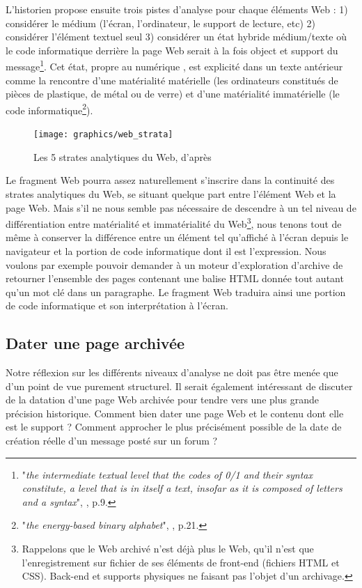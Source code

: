 \documentclass[symmetric,justified,marginals=raggedouter]{tufte-book}
\begin{document}
L'historien propose ensuite trois pistes d'analyse pour chaque éléments Web : 1) considérer le médium (l'écran, l'ordinateur, le support de lecture, etc) 2) considérer l'élément textuel seul 3) considérer un état hybride médium/texte où le code informatique derrière la page Web serait à la fois object et support du message\footnote{"\textit{the intermediate textual level that the codes of 0/1 and their syntax constitute, a level that is in itself a text, insofar as it is composed of letters and a syntax}", \citep{brugger_website_2009}, p.9.}. Cet état, propre au numérique \citep{finnemann_modernity_1997}, est explicité dans un texte antérieur \citep{brugger_does_2002} comme la rencontre d'une matérialité matérielle (les ordinateurs constitués de pièces de plastique, de métal ou de verre) et d'une matérialité immatérielle (le code informatique\footnote{"\textit{the energy-based binary alphabet}", \citep{brugger_does_2002}, p.21.}).

\begin{figure}
  \centering
  \texttt{[image: graphics/web\_strata]}
  \caption{Les 5 strates analytiques du Web, d'après \citep{brugger_website_2009}}
  \label{fig:web_strata}
\end{figure}

Le fragment Web pourra assez naturellement s'inscrire dans la continuité des strates analytiques du Web, se situant quelque part entre l'élément Web et la page Web. Mais s'il ne nous semble pas nécessaire de descendre à un tel niveau de différentiation entre matérialité et immatérialité du Web\footnote{Rappelons que le Web archivé n'est déjà plus le Web, qu'il n'est que l'enregistrement sur fichier de ses éléments de front-end (fichiers HTML et CSS). Back-end et supports physiques ne faisant pas l'objet d'un archivage.}, nous tenons tout de même à conserver la différence entre un élément tel qu'affiché à l'écran depuis le navigateur et la portion de code informatique dont il est l'expression. Nous voulons par exemple pouvoir demander à un moteur d'exploration d'archive de retourner l'ensemble des pages contenant une balise HTML donnée tout autant qu'un mot clé dans un paragraphe. Le fragment Web traduira ainsi une portion de code informatique et son interprétation à l'écran.

\subsection{Dater une page archivée}

\par\noindent Notre réflexion sur les différents niveaux d'analyse ne doit pas être menée que d'un point de vue purement structurel. Il serait également intéressant de discuter de la datation d'une page Web archivée pour tendre vers une plus grande précision historique. Comment bien dater une page Web et le contenu dont elle est le support ? Comment approcher le plus précisément possible de la date de création réelle d'un message posté sur un forum ?\\
\end{document}
